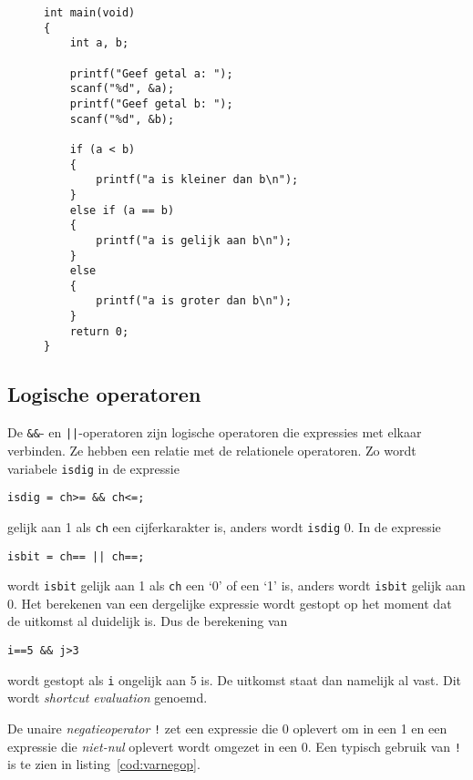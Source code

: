 \begin{figure}[!ht]
\begin{lstlisting}[caption=Voorbeeld van een beslissing.,label=cod:varexampleif0]
int main(void)
{
    int a, b;
    
    printf("Geef getal a: ");
    scanf("%d", &a);
    printf("Geef getal b: ");
    scanf("%d", &b);

    if (a < b)
    {
        printf("a is kleiner dan b\n");
    }
    else if (a == b)
    {
        printf("a is gelijk aan b\n");
    }
    else
    {
        printf("a is groter dan b\n");
    }
    return 0;
}
\end{lstlisting}
\end{figure}

\subsection{Logische operatoren}
De \texttt{\&\&}- en \texttt{||}-operatoren zijn logische operatoren die expressies met elkaar verbinden. Ze hebben een relatie met de relationele operatoren. Zo wordt variabele \texttt{isdig} in de expressie

\hspace*{1em}\texttt{isdig = ch>=\textquotesingle\ \&\& ch<=\textquotesingle;}

gelijk aan 1 als \texttt{ch} een cijferkarakter is, anders wordt \texttt{isdig} 0. In de expressie

\hspace*{1em}\texttt{isbit = ch==\textquotesingle\ || ch==\textquotesingle;}

wordt \texttt{isbit} gelijk aan 1 als \texttt{ch} een `0' of een `1' is, anders wordt \texttt{isbit} gelijk aan 0. Het berekenen van een dergelijke expressie wordt gestopt op het moment dat de uitkomst al duidelijk is. Dus de berekening van

\hspace*{1em}\texttt{i==5 \&\& j>3}

wordt gestopt als \texttt{i} ongelijk aan 5 is. De uitkomst staat dan namelijk al vast. Dit wordt \textsl{shortcut evaluation} genoemd.

De unaire \textsl{negatieoperator} \texttt{!} zet een expressie die 0 oplevert om in een 1 en een expressie die \textsl{niet-nul} oplevert wordt omgezet in een 0. Een typisch gebruik van \texttt{!} is te zien in listing~\ref{cod:varnegop}.

